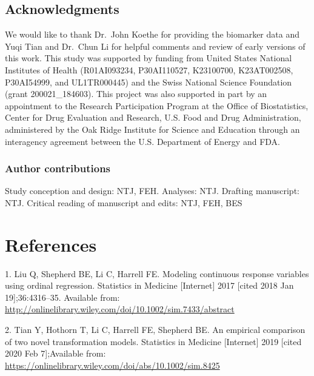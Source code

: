\documentclass[
]{article}
\begin{document}
\hypertarget{acknowledgments}{%
\subsection{Acknowledgments}\label{acknowledgments}}

We would like to thank Dr.~John Koethe for providing the biomarker data and Yuqi Tian and Dr.~Chun Li for helpful comments and review of early versions of this work. This study was supported by funding from United States National Institutes of Health (R01AI093234, P30AI110527, K23100700, K23AT002508, P30AI54999, and UL1TR000445) and the Swiss National Science Foundation (grant 200021\_184603). This project was also supported in part by an appointment to the Research Participation Program at the Office of Biostatistics, Center for Drug Evaluation and Research, U.S. Food and Drug Administration, administered by the Oak Ridge Institute for Science and Education through an interagency agreement between the U.S. Department of Energy and FDA.

\hypertarget{author-contributions}{%
\subsubsection{Author contributions}\label{author-contributions}}

Study conception and design: NTJ, FEH. Analyses: NTJ. Drafting manuscript: NTJ. Critical reading of manuscript and edits: NTJ, FEH, BES

\newpage

\hypertarget{references}{%
\section*{References}\label{references}}

\hypertarget{refs}{}
\leavevmode\hypertarget{ref-liu_modeling_2017}{}%
1. Liu Q, Shepherd BE, Li C, Harrell FE. Modeling continuous response variables using ordinal regression. Statistics in Medicine {[}Internet{]} 2017 {[}cited 2018 Jan 19{]};36:4316--35. Available from: \url{http://onlinelibrary.wiley.com/doi/10.1002/sim.7433/abstract}

\leavevmode\hypertarget{ref-tian_empirical_2019}{}%
2. Tian Y, Hothorn T, Li C, Harrell FE, Shepherd BE. An empirical comparison of two novel transformation models. Statistics in Medicine {[}Internet{]} 2019 {[}cited 2020 Feb 7{]};Available from: \url{https://onlinelibrary.wiley.com/doi/abs/10.1002/sim.8425}
\end{document}
